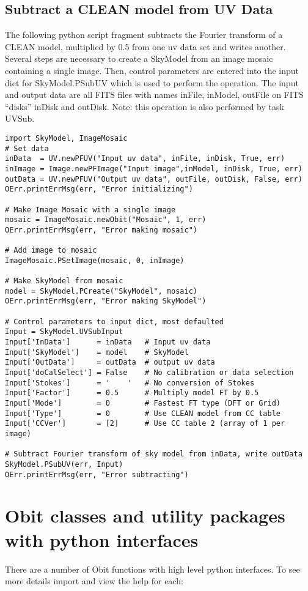 \documentclass[11pt]{report}
\begin{document}
\subsection{Subtract a CLEAN model from UV Data}
The following python script fragment subtracts the Fourier transform
of a CLEAN model, multiplied by 0.5 from one uv data set and writes
another.
Several steps are necessary to create a SkyModel from an image mosaic
containing a single image.
Then, control parameters are entered into the input dict for
SkyModel.PSubUV which is used to perform the operation.
The input and output data are all FITS files with names inFile,
inModel, outFile on FITS ``disks'' inDisk and outDisk.
Note: this operation is also performed by task UVSub.
\begin{verbatim}
import SkyModel, ImageMosaic
# Set data
inData  = UV.newPFUV("Input uv data", inFile, inDisk, True, err)
inImage = Image.newPFImage("Input image",inModel, inDisk, True, err)
outData = UV.newPFUV("Output uv data", outFile, outDisk, False, err)
OErr.printErrMsg(err, "Error initializing")

# Make Image Mosaic with a single image
mosaic = ImageMosaic.newObit("Mosaic", 1, err)
OErr.printErrMsg(err, "Error making mosaic")

# Add image to mosaic
ImageMosaic.PSetImage(mosaic, 0, inImage)

# Make SkyModel from mosaic
model = SkyModel.PCreate("SkyModel", mosaic)
OErr.printErrMsg(err, "Error making SkyModel")

# Control parameters to input dict, most defaulted
Input = SkyModel.UVSubInput
Input['InData']      = inData   # Input uv data
Input['SkyModel']    = model    # SkyModel
Input['OutData']     = outData  # output uv data
Input['doCalSelect'] = False    # No calibration or data selection
Input['Stokes']      = '    '   # No conversion of Stokes
Input['Factor']      = 0.5      # Multiply model FT by 0.5
Input['Mode']        = 0        # Fastest FT type (DFT or Grid)
Input['Type']        = 0        # Use CLEAN model from CC table
Input['CCVer']       = [2]      # Use CC table 2 (array of 1 per image)

# Subtract Fourier transform of sky model from inData, write outData
SkyModel.PSubUV(err, Input)
OErr.printErrMsg(err, "Error subtracting")
\end{verbatim}

\section{Obit classes and utility packages with python interfaces}
   There are a number of Obit functions with high level python
interfaces.  To see more details import and view the help for each:
\end{document}
